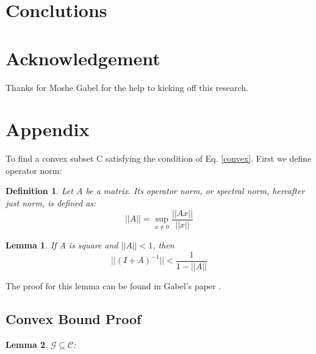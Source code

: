 \documentclass[11pt,twocolumn,varwidth=true,a4paper,fleqn]{article}
\newtheorem{lemma}{Lemma}
\newtheorem{definition}{Definition}
\begin{document}
\section*{Conclutions}
\section*{Acknowledgement}
Thanks for Moshe Gabel for the help to kicking off this research.




\appendix
\section{Appendix} \label{AppendixA}
To find a convex subset C satisfying the condition of Eq. \ref{convex}. 
First we define operator norm:
\begin{definition}
Let $A$ be a matrix. Its operator norm, or
spectral norm, hereafter just norm, is defined as:
\begin{equation*}
||A|| = \sup_{x \neq 0}\frac{||Ax||}{||x||} 
\end{equation*}
\end{definition}

\begin{lemma} \label{lemma:newman}
If A is square and $||A|| < 1$, then
\begin{equation*}
||(I+A)^{-1}|| < \frac{1}{1-||A||}
\end{equation*}
\end{lemma}
The proof for this lemma can be found in Gabel's paper
\cite{gabel2015monitoring}.

\subsection{Convex Bound Proof}
\begin{lemma}
$\mathcal{G} \subseteq \mathcal{C}$:
\end{lemma}
\end{document}
